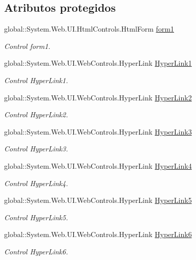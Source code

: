 \subsection*{Atributos protegidos}
\begin{DoxyCompactItemize}
\item 
global\+::\+System.\+Web.\+U\+I.\+Html\+Controls.\+Html\+Form \mbox{\hyperlink{classInicio_1_1Profesor_1_1Profesor_a27da636e45ba383475b5b89d227a3cb1}{form1}}
\begin{DoxyCompactList}\small\item\em Control form1. \end{DoxyCompactList}\item 
global\+::\+System.\+Web.\+U\+I.\+Web\+Controls.\+Hyper\+Link \mbox{\hyperlink{classInicio_1_1Profesor_1_1Profesor_ad9b39bf7cbebc1512506a47d54b83d27}{Hyper\+Link1}}
\begin{DoxyCompactList}\small\item\em Control Hyper\+Link1. \end{DoxyCompactList}\item 
global\+::\+System.\+Web.\+U\+I.\+Web\+Controls.\+Hyper\+Link \mbox{\hyperlink{classInicio_1_1Profesor_1_1Profesor_a6c75c55a1c83aa317b4cb4627e3a48cb}{Hyper\+Link2}}
\begin{DoxyCompactList}\small\item\em Control Hyper\+Link2. \end{DoxyCompactList}\item 
global\+::\+System.\+Web.\+U\+I.\+Web\+Controls.\+Hyper\+Link \mbox{\hyperlink{classInicio_1_1Profesor_1_1Profesor_a741df29afdde160d779387af3d361b8f}{Hyper\+Link3}}
\begin{DoxyCompactList}\small\item\em Control Hyper\+Link3. \end{DoxyCompactList}\item 
global\+::\+System.\+Web.\+U\+I.\+Web\+Controls.\+Hyper\+Link \mbox{\hyperlink{classInicio_1_1Profesor_1_1Profesor_a41defc3c5d27fcb0e5b001b0ff781fe3}{Hyper\+Link4}}
\begin{DoxyCompactList}\small\item\em Control Hyper\+Link4. \end{DoxyCompactList}\item 
global\+::\+System.\+Web.\+U\+I.\+Web\+Controls.\+Hyper\+Link \mbox{\hyperlink{classInicio_1_1Profesor_1_1Profesor_af7b5f3cdfb5cac1fc80c5717283155f6}{Hyper\+Link5}}
\begin{DoxyCompactList}\small\item\em Control Hyper\+Link5. \end{DoxyCompactList}\item 
global\+::\+System.\+Web.\+U\+I.\+Web\+Controls.\+Hyper\+Link \mbox{\hyperlink{classInicio_1_1Profesor_1_1Profesor_ab97897a5f96e1b0a1479df3f8d36c3c5}{Hyper\+Link6}}
\begin{DoxyCompactList}\small\item\em Control Hyper\+Link6. \end{DoxyCompactList}\end{DoxyCompactItemize}


